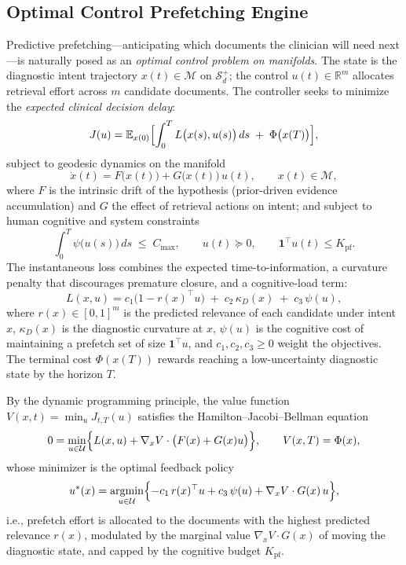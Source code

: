 \documentclass[11pt]{article}
\begin{document}
\subsection{Optimal Control Prefetching Engine}
\label{sec:control}

Predictive prefetching---anticipating which documents the clinician will need next---is naturally posed as an \emph{optimal control problem on manifolds}. The state is the diagnostic intent trajectory $x(t)\in\mathcal{M}$ on $\mathcal{S}_d^+$; the control $u(t)\in\mathbb{R}^{m}$ allocates retrieval effort across $m$ candidate documents. The controller seeks to minimize the \emph{expected clinical decision delay}:
\begin{equation}
J(u) = \mathbb{E}_{x(0)}\Bigl[ \int_0^{T} L\bigl(x(s), u(s)\bigr)\,ds \;+\; \Phi\bigl(x(T)\bigr) \Bigr],
\label{eq:ocost}
\end{equation}
subject to geodesic dynamics on the manifold
\begin{equation}
\dot{x}(t) = F\bigl(x(t)\bigr) + G\bigl(x(t)\bigr)\,u(t), \qquad x(t)\in\mathcal{M},
\label{eq:odynamics}
\end{equation}
where $F$ is the intrinsic drift of the hypothesis (prior-driven evidence accumulation) and $G$ the effect of retrieval actions on intent; and subject to human cognitive and system constraints
\begin{equation}
\int_0^{T} \psi\bigl(u(s)\bigr)\,ds \;\le\; C_{\max}, \qquad u(t)\succeq 0, \qquad \mathbf{1}^{\top}u(t) \le K_{\mathrm{pf}}.
\label{eq:oconstraints}
\end{equation}
The instantaneous loss combines the expected time-to-information, a curvature penalty that discourages premature closure, and a cognitive-load term:
\begin{equation}
L(x,u) = c_1\bigl(1 - r(x)^{\top}u\bigr) \;+\; c_2\,\kappa_D(x) \;+\; c_3\,\psi(u),
\label{eq:oloss}
\end{equation}
where $r(x)\in[0,1]^m$ is the predicted relevance of each candidate under intent $x$, $\kappa_D(x)$ is the diagnostic curvature at $x$, $\psi(u)$ is the cognitive cost of maintaining a prefetch set of size $\mathbf{1}^{\top}u$, and $c_1,c_2,c_3\ge 0$ weight the objectives. The terminal cost $\Phi(x(T))$ rewards reaching a low-uncertainty diagnostic state by the horizon $T$.

By the dynamic programming principle, the value function $V(x,t) = \min_{u} J_{t,T}(u)$ satisfies the Hamilton--Jacobi--Bellman equation
\begin{equation}
0 = \min_{u \in \mathcal{U}}\Bigl\{ L(x,u) + \nabla_x V \cdot \bigl(F(x)+G(x)u\bigr) \Bigr\}, \qquad V(x,T)=\Phi(x),
\label{eq:hjb}
\end{equation}
whose minimizer is the optimal feedback policy
\begin{equation}
u^{*}(x) = \operatorname*{argmin}_{u\in\mathcal{U}} \Bigl\{ -c_1\, r(x)^{\top}u + c_3\,\psi(u) + \nabla_x V \cdot G(x)\,u \Bigr\},
\label{eq:opolicy}
\end{equation}
i.e., prefetch effort is allocated to the documents with the highest predicted relevance $r(x)$, modulated by the marginal value $\nabla_x V\cdot G(x)$ of moving the diagnostic state, and capped by the cognitive budget $K_{\mathrm{pf}}$.
\end{document}
